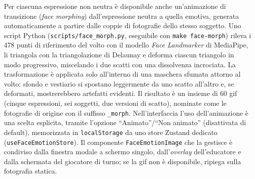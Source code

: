 \documentclass[12pt]{report}
\begin{document}
Per ciascuna espressione non neutra è disponibile anche un'animazione di transizione (\textit{face morphing}) dall'espressione neutra a quella emotiva, generata automaticamente a partire dalle coppie di fotografie dello stesso soggetto. Uno script Python (\texttt{scripts/face\_morph.py}, eseguibile con \texttt{make face-morph}) rileva i 478 punti di riferimento del volto con il modello \textit{Face Landmarker} di MediaPipe, li triangola con la triangolazione di Delaunay e deforma ciascun triangolo in modo progressivo, miscelando i due scatti con una dissolvenza incrociata. La trasformazione è applicata solo all'interno di una maschera sfumata attorno al volto: sfondo e vestiario si spostano leggermente da uno scatto all'altro e, se deformati, mostrerebbero artefatti evidenti. Il risultato è un insieme di 60 gif (cinque espressioni, sei soggetti, due versioni di scatto), nominate come le fotografie di origine con il suffisso \texttt{\_morph}. Nell'interfaccia l'uso dell'animazione è una scelta esplicita, tramite l'opzione ``Animato''/``Non animato'' (disattivata di default), memorizzata in \texttt{localStorage} da uno store Zustand dedicato (\texttt{useFaceEmotionStore}). Il componente \texttt{FaceEmotionImage} che la gestisce è condiviso dalla finestra modale a schermo singolo, dall'\textit{overlay} dell'educatore e dalla schermata del giocatore di turno; se la gif non è disponibile, ripiega sulla fotografia statica.
\end{document}
